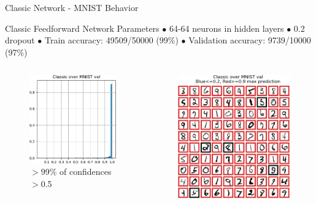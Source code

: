 \documentclass{beamer}
\begin{document}
\begin{frame}{Classic Network - MNIST Behavior}
    
    \begin{block}{Classic Feedforward Network Parameters}
    $\bullet$ 64-64 neurons in hidden layers $\bullet$ 0.2 dropout $\bullet$ Train accuracy: 49509/50000 (99\%) $\bullet$ Validation accuracy: 9739/10000 (97\%)
    \end{block}

    \begin{columns}
    \begin{column}{.5\textwidth}
    \begin{figure}
        \centering
        \includegraphics[width=.82\textwidth]{images/mnist-behavior/classic-hist-val.png}
        \caption*{ $>$99\% of confidences $>$0.5}
    \end{figure}
    \end{column}
    \begin{column}{.5\textwidth}
    \begin{figure}
        \raggedright
        \vspace{-3mm}
        \includegraphics[width=.73\textwidth]{images/mnist-behavior/classic-pred-val.png}

\end{figure}
\end{column}
\end{columns}
\end{frame}
\end{document}
